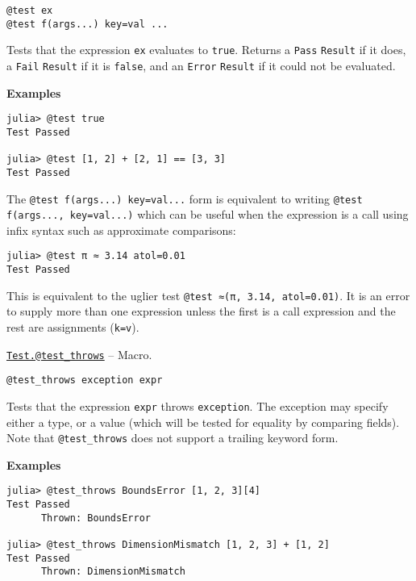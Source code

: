 \begin{adjustwidth}{2em}{0pt}


\begin{verbatim}
@test ex
@test f(args...) key=val ...
\end{verbatim}

Tests that the expression \texttt{ex} evaluates to \texttt{true}. Returns a \texttt{Pass} \texttt{Result} if it does, a \texttt{Fail} \texttt{Result} if it is \texttt{false}, and an \texttt{Error} \texttt{Result} if it could not be evaluated.

\textbf{Examples}


\begin{verbatim}
julia> @test true
Test Passed

julia> @test [1, 2] + [2, 1] == [3, 3]
Test Passed
\end{verbatim}

The \texttt{@test f(args...) key=val...} form is equivalent to writing \texttt{@test f(args..., key=val...)} which can be useful when the expression is a call using infix syntax such as approximate comparisons:


\begin{verbatim}
julia> @test π ≈ 3.14 atol=0.01
Test Passed
\end{verbatim}

This is equivalent to the uglier test \texttt{@test ≈(π, 3.14, atol=0.01)}. It is an error to supply more than one expression unless the first is a call expression and the rest are assignments (\texttt{k=v}).



\end{adjustwidth}
\hypertarget{5527166796157013832}{}
\hyperlink{5527166796157013832}{\texttt{Test.@test\_throws}}  -- {Macro.}

\begin{adjustwidth}{2em}{0pt}


\begin{verbatim}
@test_throws exception expr
\end{verbatim}

Tests that the expression \texttt{expr} throws \texttt{exception}. The exception may specify either a type, or a value (which will be tested for equality by comparing fields). Note that \texttt{@test\_throws} does not support a trailing keyword form.

\textbf{Examples}


\begin{verbatim}
julia> @test_throws BoundsError [1, 2, 3][4]
Test Passed
      Thrown: BoundsError

julia> @test_throws DimensionMismatch [1, 2, 3] + [1, 2]
Test Passed
      Thrown: DimensionMismatch
\end{verbatim}



\end{adjustwidth}

